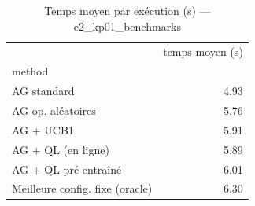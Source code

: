 \begin{table}
\caption{Temps moyen par exécution (s) — e2_kp01_benchmarks}
\label{tab:temps}
\begin{tabular}{lr}
\toprule
 & temps moyen (s) \\
method &  \\
\midrule
AG standard & 4.93 \\
AG op. aléatoires & 5.76 \\
AG + UCB1 & 5.91 \\
AG + QL (en ligne) & 5.89 \\
AG + QL pré-entraîné & 6.01 \\
Meilleure config. fixe (oracle) & 6.30 \\
\bottomrule
\end{tabular}
\end{table}
